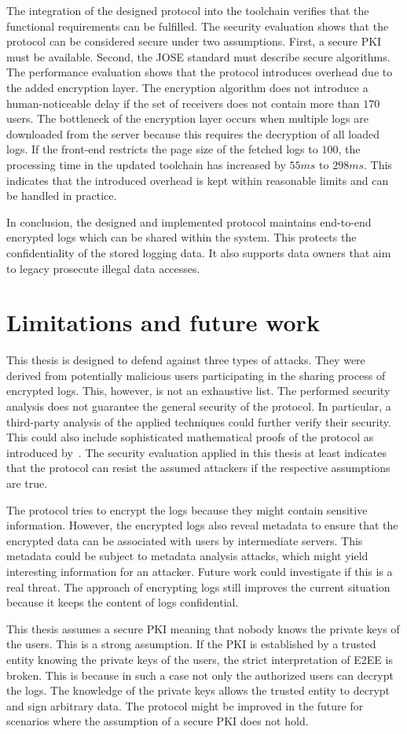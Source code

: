 \documentclass[../main.tex]{subfiles}
\begin{document}
The integration of the designed protocol into the toolchain verifies that the functional requirements can be fulfilled.
The security evaluation shows that the protocol can be considered secure under two assumptions.
First, a secure PKI must be available.
Second, the JOSE standard must describe secure algorithms.
The performance evaluation shows that the protocol introduces overhead due to the added encryption layer.
The encryption algorithm does not introduce a human-noticeable delay if the set of receivers does not contain more than $170$ users.
The bottleneck of the encryption layer occurs when multiple logs are downloaded from the server because this requires the decryption of all loaded logs.
If the front-end restricts the page size of the fetched logs to $100$, the processing time in the updated toolchain has increased by $55ms$ to $298ms$.
This indicates that the introduced overhead is kept within reasonable limits and can be handled in practice.

In conclusion, the designed and implemented protocol maintains end-to-end encrypted logs which can be shared within the system.
This protects the confidentiality of the stored logging data.
It also supports data owners that aim to legacy prosecute illegal data accesses.

\section{Limitations and future work}
\label{sec:limitations}
This thesis is designed to defend against three types of attacks.
They were derived from potentially malicious users participating in the sharing process of encrypted logs.
This, however, is not an exhaustive list.
The performed security analysis does not guarantee the general security of the protocol.
In particular, a third-party analysis of the applied techniques could further verify their security.
This could also include sophisticated mathematical proofs of the protocol as introduced by~\cite{Katz2020}.   
The security evaluation applied in this thesis at least indicates that the protocol can resist the assumed attackers if the respective assumptions are true.

The protocol tries to encrypt the logs because they might contain sensitive information.
However, the encrypted logs also reveal metadata to ensure that the encrypted data can be associated with users by intermediate servers.
This metadata could be subject to metadata analysis attacks, which might yield interesting information for an attacker.
Future work could investigate if this is a real threat.
The approach of encrypting logs still improves the current situation because it keeps the content of logs confidential.

This thesis assumes a secure PKI meaning that nobody knows the private keys of the users.
This is a strong assumption.
If the PKI is established by a trusted entity knowing the private keys of the users, the strict interpretation of E2EE is broken.
This is because in such a case not only the authorized users can decrypt the logs.
The knowledge of the private keys allows the trusted entity to decrypt and sign arbitrary data.
The protocol might be improved in the future for scenarios where the assumption of a secure PKI does not hold.
\end{document}
